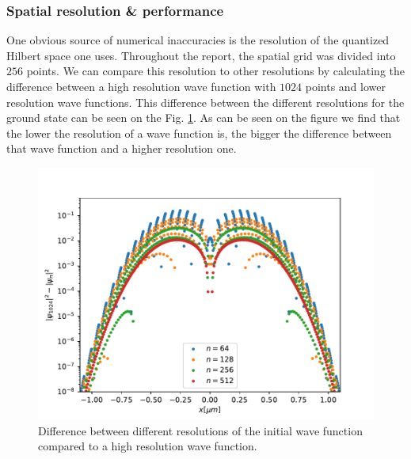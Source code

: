 \documentclass[a4paper, twocolumn]{revtex4-1}
\begin{document}
\subsubsection{Spatial resolution \& performance}
One obvious source of numerical inaccuracies is the resolution of the quantized Hilbert space one uses. Throughout the report, the spatial grid was divided into $256$ points. We can compare this resolution to other resolutions by calculating the difference between a high resolution wave function with $1024$ points and lower resolution wave functions. This difference between the different resolutions for the ground state can be seen on the Fig. \ref{fig:groundstateGrid}. As can be seen on the figure we find that the lower the resolution of a wave function is, the bigger the difference between that wave function and a higher resolution one. \\
\begin{figure}
	\includegraphics[width=\columnwidth]{graphics/stateAnalysis/GroundstateGrid.pdf}
	\caption{Difference between different resolutions of the initial wave function compared to a high resolution wave function.}
	\label{fig:groundstateGrid}
\end{figure}
\end{document}
